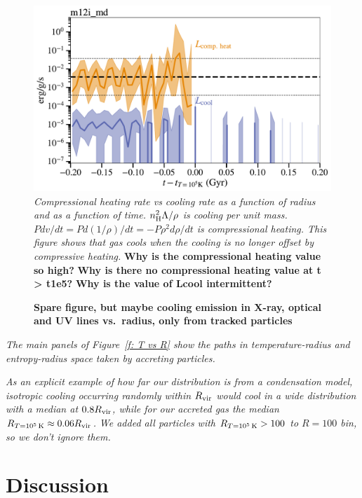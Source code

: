 \documentclass[fleqn,usenatbib]{mnras}
\newcommand{\Rcool}{R_{T=10^5\,{\rm K}}}
\begin{document}
\begin{figure}
\includegraphics[width=\columnwidth]{figures/heating_vs_cooling_m12i_md.pdf}
\caption{
\textit{
Compressional heating rate vs cooling rate as a function of radius and as a function of time.
$n_{\rm H}^2 \Lambda / \rho$ is cooling per unit mass.
$P dv/dt = P d(1/\rho)/dt = -P \rho^2 d\rho/dt$ is compressional heating.
This figure shows that gas cools when the cooling is no longer offset by compressive heating.
}
\textbf{Why is the compressional heating value so high?}
\textbf{Why is there no compressional heating value at t > t1e5?}
\textbf{Why is the value of Lcool intermittent?}
}
\end{figure}

\begin{figure}
    \centering
    \caption{
    \textbf{Spare figure, but maybe
    cooling emission in X-ray, optical and UV lines vs.\ radius, only from tracked particles
    }
    }
    \label{f:emission}
\end{figure}

\textit{
The main panels of Figure~\ref{f: T vs R} show the paths in temperature-radius and entropy-radius space taken by accreting particles.
}

\textit{
As an explicit example of how far our distribution is from a condensation model, isotropic cooling occurring randomly within $R_{\rm vir}$ would cool in a wide distribution with a median at $0.8 R_{\rm vir}$, while for our accreted gas the median $\Rcool \approx 0.06 R_{\rm vir}$.
}
\textit{We added all particles with $\Rcool>100$ to $R=100$ bin, so we don't ignore them.}

\section{Discussion}
\end{document}
